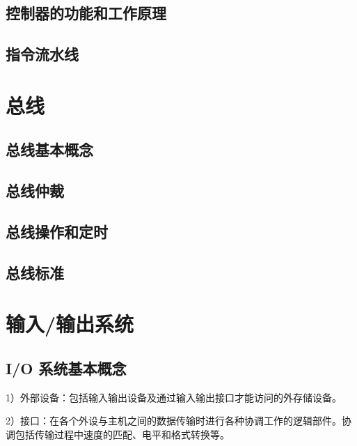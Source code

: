 \documentclass{ctexart}
\begin{document}
\subsection{控制器的功能和工作原理}

\subsection{指令流水线}










\section{总线}

\subsection{总线基本概念}

\subsection{总线仲裁}

\subsection{总线操作和定时}

\subsection{总线标准}

















\section{输入/输出系统}
\subsection{ I/O 系统基本概念}
1）外部设备：包括输入输出设备及通过输入输出接口才能访问的外存储设备。

2）接口：在各个外设与主机之间的数据传输时进行各种协调工作的逻辑部件。协调包括传输过程中速度的匹配、电平和格式转换等。
\end{document}
